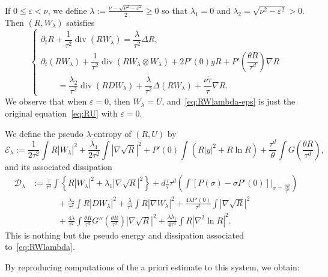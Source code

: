 \documentclass[AHL,Unicode,longabstracts]{cedram}
\DeclareMathOperator{\DIV}{div}
\newcommand*\<{\left\langle}
\renewcommand*\>{\right\rangle}
\renewcommand*\le{\leqslant}
\renewcommand*\ge{\geqslant}
\newcommand*\eps{\varepsilon}
\begin{document}
\begin{rema}\label{rem:RWlambda-eps}
If $0 \le \eps < \nu$, we define $\lambda := \frac{\nu - \sqrt{\nu^2 - \eps^2}}{2} \ge 0$ so that $\lambda_1 = 0$ and $\lambda_2 = \sqrt{\nu^2 - \eps^2} >0$. Then $(R, W_{\lambda})$ satisfies
\begin{equation}\label{eq:RWlambda-eps}
\begin{cases}
\partial_t R + \dfrac{1}{\tau^2}\DIV(R W_{\lambda})=\dfrac{\lambda}{\tau^2} \Delta R,\\
\partial_t (R W_{\lambda}) + \dfrac{1}{\tau^2} \DIV (R W_{\lambda} \otimes W_{\lambda}) + 2 P'(0) y R + P' \left(\dfrac{\theta R}{\tau^d} \right) \nabla R \\
\qquad = \dfrac{\lambda_2}{\tau^2} \DIV(R D W_{\lambda}) +\dfrac{\lambda}{\tau^2} \Delta(R W_{\lambda}) + \dfrac{\nu \dot \tau}{\tau}\nabla R.
\end{cases}
\end{equation}
We observe that when $\eps = 0$, then $W_{\lambda} = U$, and~\eqref{eq:RWlambda-eps} is just the original equation~\eqref{eq:RU} with $\eps = 0$.
\end{rema}

We define the pseudo $\lambda$-entropy of $(R,U)$ by
\begin{equation*}
\mathcal E_\lambda :=
\frac{1}{2\tau^2}\int R|W_\lambda|^2 +\frac{\lambda_1}{2\tau^2} \int|\nabla \sqrt R|^2 + P'(0)\int (R|y|^2 + R \ln R) + \frac{\tau^d}{\theta}\int G\left(\frac{\theta R}{\tau^d}\right),
\end{equation*}
and its associated dissipation
\begin{align*}
\mathcal D_\lambda &:= \frac{\dot \tau}{\tau^3}\int \left\{ R |W_\lambda|^2 + \lambda_1 |\nabla \sqrt R|^2 \right\} + d\frac{\dot \tau}{\tau} \tau^d \left(\int \left[P\left(\sigma\right) -\sigma P'(0) \right] \big|_{\sigma= \frac{\theta R}{\tau^d}} \right) \\
&\qquad\quad + \frac{\lambda_2}{\tau^4} \int R |D W_\lambda|^2 + \frac{\lambda}{\tau^4} \int R |\nabla W_\lambda|^2 + \frac{4\lambda P'(0)}{\tau^2} \int |\nabla \sqrt R|^2 \\
&\qquad\quad + \frac{4\lambda}{\tau^2} \int \frac{\theta R}{\tau^d} G'' \left(\tfrac{\theta R}{\tau^d} \right) |\nabla \sqrt R|^2 + \frac{\lambda \lambda_1}{4 \tau^4} \int R |\nabla^2 \ln R |^2.
\end{align*}
This is nothing but the pseudo energy and dissipation associated to~\eqref{eq:RWlambda}.

By reproducing computations of the a priori estimate to this system, we obtain:
\end{document}
